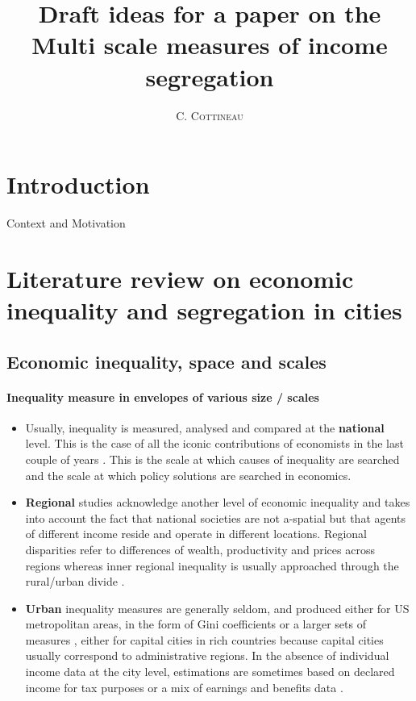 \documentclass[11.5pt]{article}
\newcommand{\noun}[1]{\textsc{#1}}
\begin{document}
\title{Draft ideas for a paper on the Multi scale measures of income segregation \\
}

\author{\noun{C. Cottineau}}


\maketitle

\justify


\section{Introduction}

Context and Motivation


\section{Literature review on economic inequality and segregation in cities}

\subsection{Economic inequality, space and scales}

\paragraph{Inequality measure in envelopes of various size / scales}
\begin{itemize}
\item Usually, inequality is measured, analysed and compared at the {\bf national} level. This is the case of all the iconic contributions of economists in the last couple of years \cite{piketty_capital_2013, atkinson_inequality_2015, stiglitz_2015_The}. This is the scale at which causes of inequality are searched and the scale at which policy solutions are searched in economics.
\item {\bf Regional} studies acknowledge another level of economic inequality and takes into account the fact that national societies are not a-spatial but that agents of different income reside and operate in different locations. Regional disparities refer to differences of wealth, productivity and prices across regions \cite{Kanbur_2005_spatial, McCann_2016_the} whereas inner regional inequality is usually approached through the rural/urban divide \cite{Young_2013_inequality, Royuela_2014_income}.
\item {\bf Urban} inequality measures are generally seldom, and produced either for US metropolitan areas, in the form of Gini coefficients \cite{long1977income} or a larger sets of measures \cite{glaeser_inequality_2009}, either for capital cities in rich countries \cite{tammaru_2015_socio, Boulant_2016_Income} because capital cities usually correspond to administrative regions. In the absence of individual income data at the city level, estimations are sometimes based on declared income for tax purposes \cite{cottineau_defining_2016} or a mix of earnings and benefits data \cite{centre_for_cities_cities_2017}.
\end{itemize}
\end{document}
